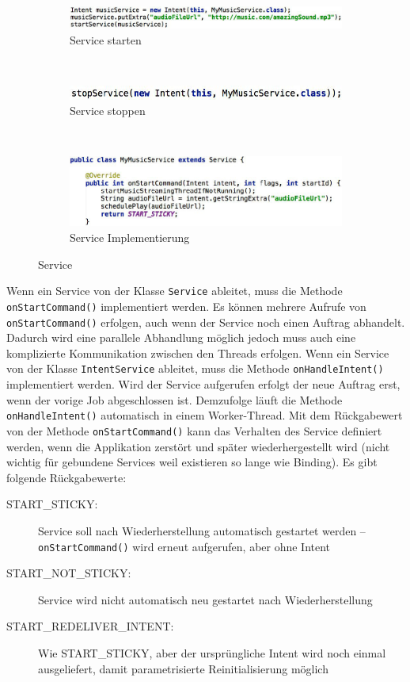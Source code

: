 \begin{figure}
	\centering
	\begin{subfigure}[b]{0.48\textwidth}
		\includegraphics[width=\textwidth]{fig/service-starten}
		\caption{Service starten}
	\end{subfigure}
	~
	\begin{subfigure}[b]{0.48\textwidth}
		\includegraphics[width=\textwidth]{fig/service-stoppen}
		\caption{Service stoppen}
	\end{subfigure}
	~
	\begin{subfigure}[b]{0.48\textwidth}
		\includegraphics[width=\textwidth]{fig/service-implementierung}
		\caption{Service Implementierung}
	\end{subfigure}
	\caption{Service}
	\label{fig:service}
\end{figure}

Wenn ein Service von der Klasse \texttt{Service} ableitet, muss die Methode \texttt{onStartCommand()} implementiert werden. Es können mehrere Aufrufe von \texttt{onStartCommand()} erfolgen, auch wenn der Service noch einen Auftrag abhandelt. Dadurch wird eine parallele Abhandlung möglich jedoch muss auch eine komplizierte Kommunikation zwischen den Threads erfolgen.
Wenn ein Service von der Klasse \texttt{IntentService} ableitet, muss die Methode \texttt{onHandleIntent()} implementiert werden. Wird der Service aufgerufen erfolgt der neue Auftrag erst, wenn der vorige Job abgeschlossen ist. Demzufolge läuft die Methode \texttt{onHandleIntent()} automatisch in einem Worker-Thread.
Mit dem Rückgabewert von der Methode \texttt{onStartCommand()} kann das Verhalten des Service definiert werden, wenn die Applikation zerstört und später wiederhergestellt wird (nicht wichtig für gebundene Services weil existieren so lange wie Binding). Es gibt folgende Rückgabewerte:
\begin{description}
	\item[START\_STICKY:] Service soll nach Wiederherstellung automatisch gestartet werden -- \\ \texttt{onStartCommand()} wird erneut aufgerufen, aber ohne Intent
	\item[START\_NOT\_STICKY:] Service wird nicht automatisch neu gestartet nach Wiederherstellung
	\item[START\_REDELIVER\_INTENT:] Wie START\_STICKY, aber der ursprüngliche Intent wird noch einmal ausgeliefert, damit parametrisierte Reinitialisierung möglich
\end{description}

